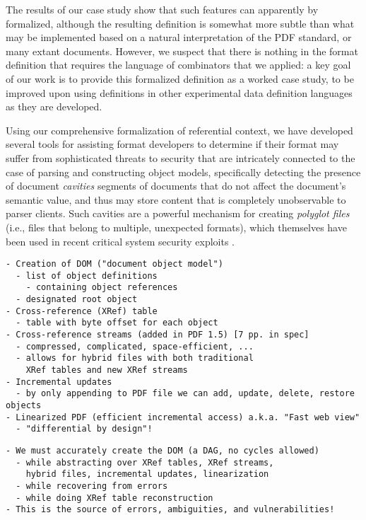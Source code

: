 The results of our case study show that such features can apparently
by formalized, although the resulting definition is somewhat more
subtle than what may be implemented based on a natural interpretation
of the PDF standard, or many extant documents. 
%
However, we suspect that there is nothing in the format definition
that requires the language of combinators that we applied: a key goal
of our work is to provide this formalized definition as a worked case
study, to be improved upon using definitions in other experimental
data definition languages as they are developed.

Using our comprehensive formalization of referential context, we have
developed several tools for assisting format developers to determine
if their format may suffer from sophisticated threats to security that
are intricately connected to the case of parsing and constructing object models,
specifically detecting the presence of document \emph{cavities}
segments of documents that do not affect the document's semantic
value, and thus may store content that is completely unobservable to
parser clients.
%
Such cavities are a powerful mechanism for creating \emph{polyglot
  files} (i.e., files that belong to multiple, unexpected formats),
which themselves have been used in recent critical system security
exploits .

\begin{lstlisting}[style=meta]
- Creation of DOM ("document object model")
  - list of object definitions
    - containing object references
  - designated root object
- Cross-reference (XRef) table
  - table with byte offset for each object
- Cross-reference streams (added in PDF 1.5) [7 pp. in spec]
  - compressed, complicated, space-efficient, ...
  - allows for hybrid files with both traditional
    XRef tables and new XRef streams
- Incremental updates
  - by only appending to PDF file we can add, update, delete, restore objects
- Linearized PDF (efficient incremental access) a.k.a. "Fast web view"
  - "differential by design"!
\end{lstlisting}
\begin{lstlisting}[style=meta]
- We must accurately create the DOM (a DAG, no cycles allowed)
  - while abstracting over XRef tables, XRef streams,
    hybrid files, incremental updates, linearization
  - while recovering from errors
  - while doing XRef table reconstruction
- This is the source of errors, ambiguities, and vulnerabilities!
\end{lstlisting}

